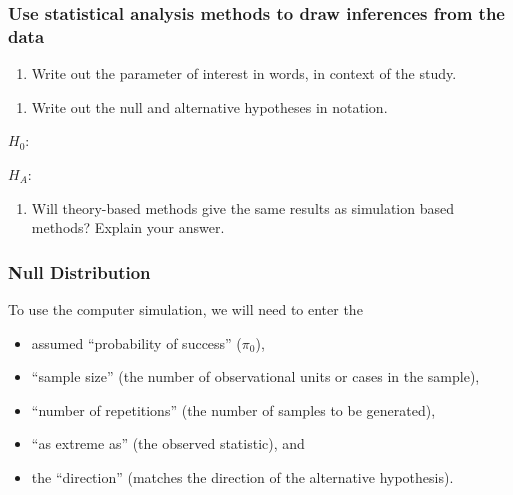 \documentclass[
]{report}
\providecommand{\tightlist}{%
  \setlength{\itemsep}{0pt}\setlength{\parskip}{0pt}}
\begin{document}
\subsubsection*{Use statistical analysis methods to draw inferences from the data}\label{use-statistical-analysis-methods-to-draw-inferences-from-the-data-2}

\begin{enumerate}
\def\labelenumi{\arabic{enumi}.}
\setcounter{enumi}{2}
\tightlist
\item
  Write out the parameter of interest in words, in context of the study.
\end{enumerate}

\vspace{0.5in}

\begin{enumerate}
\def\labelenumi{\arabic{enumi}.}
\setcounter{enumi}{3}
\tightlist
\item
  Write out the null and alternative hypotheses in notation.
\end{enumerate}

\vspace{1mm}

\(H_0:\)

\vspace{0.3in}

\(H_A:\)

\vspace{0.3in}

\begin{enumerate}
\def\labelenumi{\arabic{enumi}.}
\setcounter{enumi}{4}
\tightlist
\item
  Will theory-based methods give the same results as simulation based methods? Explain your answer.
\end{enumerate}

\vspace{1in}

\subsubsection*{Null Distribution}\label{null-distribution}

To use the computer simulation, we will need to enter the

\begin{itemize}
\item
  assumed ``probability of success'' (\(\pi_0\)),
\item
  ``sample size'' (the number of observational units or cases in the sample),
\item
  ``number of repetitions'' (the number of samples to be generated),
\item
  ``as extreme as'' (the observed statistic), and
\item
  the ``direction'' (matches the direction of the alternative hypothesis).
\end{itemize}
\end{document}
